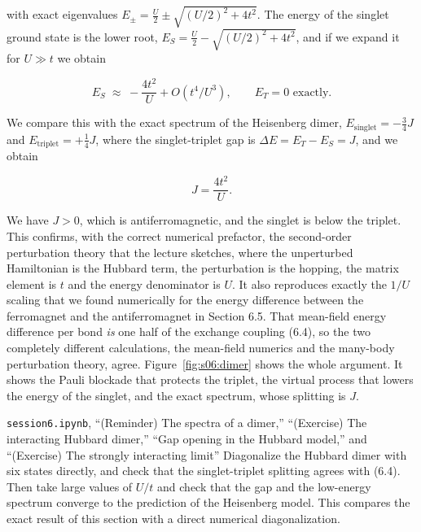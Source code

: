 with exact eigenvalues $E_\pm = \tfrac{U}{2}\pm\sqrt{(U/2)^2+4t^2}$. The energy of the singlet ground
state is the lower root, $E_S = \tfrac{U}{2}-\sqrt{(U/2)^2+4t^2}$, and if we expand it for $U\gg t$
we obtain

\begin{equation*}
E_S \;\approx\; -\frac{4t^2}{U} + O(t^4/U^3), \qquad E_T = 0 \text{ exactly.}
\end{equation*}

We compare this with the exact spectrum of the Heisenberg dimer, $E_\text{singlet}=-\tfrac34 J$ and
$E_\text{triplet}=+\tfrac14 J$, where the singlet-triplet gap is $\Delta E = E_T-E_S = J$, and we
obtain

\begin{equation}
J = \frac{4t^2}{U}.
\end{equation}

We have $J>0$, which is antiferromagnetic, and the singlet is below the triplet. This confirms, with
the correct numerical prefactor, the second-order perturbation theory that the lecture sketches, where
the unperturbed Hamiltonian is the Hubbard term, the perturbation is the hopping, the matrix element is
$t$ and the energy denominator is $U$. It also reproduces exactly the $1/U$ scaling that we found
numerically for the energy difference between the ferromagnet and the antiferromagnet in Section 6.5.
That mean-field energy difference per bond \emph{is} one half of the exchange coupling (6.4), so the two completely
different calculations, the mean-field numerics and the many-body perturbation theory, agree.
Figure~\ref{fig:s06:dimer} shows the whole argument. It shows the Pauli blockade that protects the
triplet, the virtual process that lowers the energy of the singlet, and the exact spectrum, whose
splitting is $J$.



\begin{notebookbox}{\texttt{session6.ipynb}, ``(Reminder) The spectra of a dimer,'' ``(Exercise) The interacting Hubbard dimer,'' ``Gap opening in the Hubbard model,'' and ``(Exercise) The strongly interacting limit''}
Diagonalize the Hubbard dimer with six states directly, and check that the singlet-triplet splitting
agrees with (6.4). Then take large values of $U/t$ and check that the gap and the low-energy spectrum
converge to the prediction of the Heisenberg model. This compares the exact result of this section
with a direct numerical diagonalization.
\end{notebookbox}

